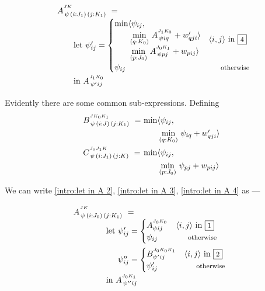 \begin{equation}\LeftEqNo
\renewcommand\arraystretch{1.5}
\begin{array}{l@{}l}
	A^{^{JK}}_{\,\psi\,(i : J_1)\,(j : K_1)} ~=~ \\
	\qquad
	\textrm{let}~\psi'_{ij} = \begin{cases} 
	  \begin{array}{@{}l@{}l@{}}\min\langle & \psi_{ij}, \\
         & \!\underset{(q:K_0)}\min ~ A^{^{J_1K_0}}_{\,\psi iq} + w'_{qji}\rangle \\
         & \!\underset{(p:J_0)}\min ~ A^{^{J_0K_1}}_{\,\psi pj} + w_{pij}\rangle \end{array} & \langle i,j\rangle\mbox{ in }\qbox4 \\
	  \psi_{ij} & \otherwise \\
	\end{cases} \\
	\qquad\textrm{in}~
	A^{^{J_1K_0}}_{\,\psi' ij}
\end{array}
\label{intro:let in A 4}
\end{equation}

Evidently there are some common sub-expressions. Defining
\begin{equation}
\renewcommand\arraystretch{1.3}
\begin{array}{l@{}l@{}l}
	B^{^{JK_0K_1}}_{\,\psi\,(i : J)\,(j : K_1)} ~=~ &
	  \min\langle & \psi_{ij}, \\ 
	&  & \!\underset{(q:K_0)}\min ~ \psi_{iq} + w'_{qji}\rangle \\[.8em]
	C^{^{J_0J_1K}}_{\,\psi\,(i : J_1)\,(j : K)} ~=~ &
	  \min\langle & \psi_{ij}, \\ 
	&  & \!\underset{(p:J_0)}\min ~ \psi_{pj} + w_{pij}\rangle 
\end{array}
\label{intro:spec of B,C}
\end{equation}

We can write \eqref{intro:let in A 2}, \eqref{intro:let in A 3}, \eqref{intro:let in A 4} as ---

\newcommand\qqquad{\qquad\qquad}

\begin{equation}\LeftEqNo
\renewcommand\arraystretch{1.5}
\begin{array}{@{}l@{}l}
    \lspan2{
	A^{^{JK}}_{\,\psi\,(i : J_0)\,(j : K_1)} ~=~ } \\
	\qqquad
	\textrm{let}~ & \psi'_{ij} = \begin{cases}
	  A^{^{J_0K_0}}_{\psi ij} & \langle i,j\rangle\mbox{ in }\qbox1 \\
	  \psi_{ij} & \otherwise
	\end{cases} \\[1.2em]
	& \psi''_{ij} = \begin{cases}
	  B^{^{J_0K_0K_1}}_{\psi' ij} & \langle i,j\rangle\mbox{ in }\qbox2 \\
	  \psi'_{ij} & \otherwise
	\end{cases} \\
	\lspan2{
	\qqquad\textrm{in}~
	A^{^{J_0K_1}}_{\,\psi'' ij} }
\end{array}
\label{intro:let in A 2 using B}
\end{equation}

